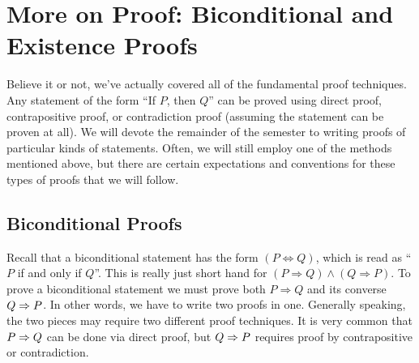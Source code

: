 \chapter{More on Proof: Biconditional and Existence Proofs}


Believe it or not, we've actually covered all of the fundamental proof techniques.  Any statement of the form ``If $P$, then $Q$'' can be proved using direct proof, contrapositive proof, or contradiction proof (assuming the statement can be proven at all).  We will devote the remainder of the semester to writing proofs of particular kinds of statements.  Often, we will still employ one of the methods mentioned above, but there are certain expectations and conventions for these types of proofs that we will follow.
\begin{center}
\end{center}
\section{Biconditional Proofs}
\noindent Recall that a biconditional statement has the form $(P \Leftrightarrow Q)$, which is read as ``$P$ if and only if $Q$''.  This is really just short hand for $(P \Rightarrow Q) \wedge (Q \Rightarrow P)$.  To prove a biconditional statement we must prove both $P \Rightarrow Q$ and its converse $Q \Rightarrow P$.  In other words, we have to write two proofs in one.  Generally speaking, the two pieces may require two different proof techniques.  It is very common that $P \Rightarrow Q$ can be done via direct proof, but $Q \Rightarrow P$ requires proof by contrapositive or contradiction.\\


